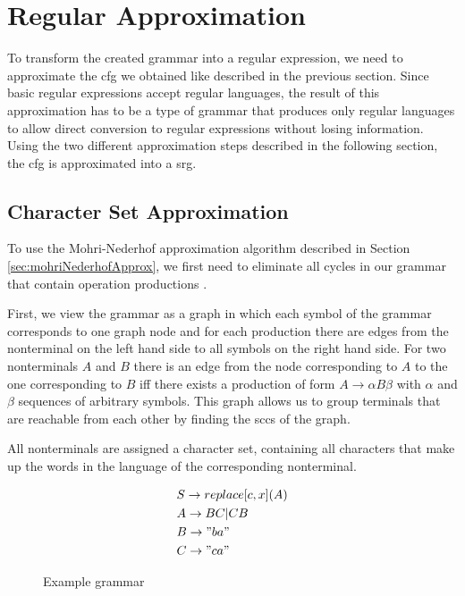 \section{Regular Approximation}\label{sec:approximation}

To transform the created grammar into a regular expression, we need to approximate the \ac{cfg} we obtained like described in the previous section. Since basic regular expressions accept regular languages, the result of this approximation has to be a type of grammar that produces only regular languages to allow direct conversion to regular expressions without losing information. Using the two different approximation steps described in the following section, the \ac{cfg} is approximated into a \acl{srg}.

\subsection{Character Set Approximation}\label{sec:charsetApprox}
To use the Mohri-Nederhof approximation algorithm described in Section \ref{sec:mohriNederhofApprox}, we first need to eliminate all cycles in our grammar that contain operation productions \cite{mohri_nederhof}.

First, we view the grammar as a graph in which each symbol of the grammar corresponds to one graph node and for each production there are edges from the nonterminal on the left hand side to all symbols on the right hand side. 
For two nonterminals $A$ and $B$ there is an edge from the node corresponding to $A$ to the one corresponding to $B$ iff there exists a production of form $A \rightarrow \alpha B \beta$ with $\alpha$ and $\beta$ sequences of arbitrary symbols.
This graph allows us to group terminals that are reachable from each other by finding the \acp{scc} of the graph.

All nonterminals are assigned a character set, containing all characters that make up the words in the language of the corresponding nonterminal.

\begin{figure}[!h]
	\begin{align*}
		&S \rightarrow replace[c, x](A)\\
		&A \rightarrow BC | CB\\
		&B \rightarrow "ba"\\
		&C \rightarrow "ca"
	\end{align*}
	\caption{Example grammar}
	\label{fig:charset:grammar}
\end{figure}


